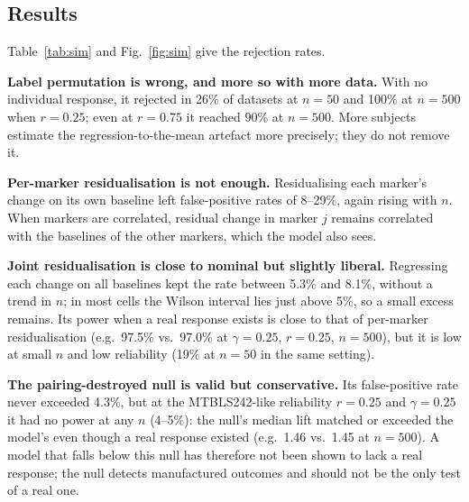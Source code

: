 \documentclass[conference]{IEEEtran}
\begin{document}
\subsection{Results}
Table~\ref{tab:sim} and Fig.~\ref{fig:sim} give the rejection rates.

\textbf{Label permutation is wrong, and more so with more data.} With no
individual response, it rejected in 26\% of datasets at $n=50$ and 100\% at
$n=500$ when $r=0.25$; even at $r=0.75$ it reached 90\% at $n=500$.
More subjects estimate the regression-to-the-mean artefact more precisely;
they do not remove it.

\textbf{Per-marker residualisation is not enough.} Residualising each
marker's change on its own baseline left false-positive rates of 8--29\%,
again rising with $n$. When markers are correlated, residual change in
marker $j$ remains correlated with the baselines of the other markers,
which the model also sees.

\textbf{Joint residualisation is close to nominal but slightly liberal.}
Regressing each change on all baselines kept the rate between 5.3\% and
8.1\%, without a trend in $n$; in most cells the Wilson interval lies just
above 5\%, so a small excess remains. Its power when a real response exists
is close to that of per-marker residualisation (e.g.\ 97.5\% vs.\ 97.0\% at
$\gamma=0.25$, $r=0.25$, $n=500$), but it is low at small $n$ and low
reliability (19\% at $n=50$ in the same setting).

\textbf{The pairing-destroyed null is valid but conservative.} Its
false-positive rate never exceeded 4.3\%, but at the MTBLS242-like reliability
$r=0.25$ and $\gamma=0.25$ it had no power at any $n$ (4--5\%): the null's
median lift matched or exceeded the model's even though a real response
existed (e.g.\ 1.46 vs.\ 1.45 at $n=500$). A model that falls below this null
has therefore not been shown to lack a real response; the null detects
manufactured outcomes and should not be the only test of a real one.
\end{document}
